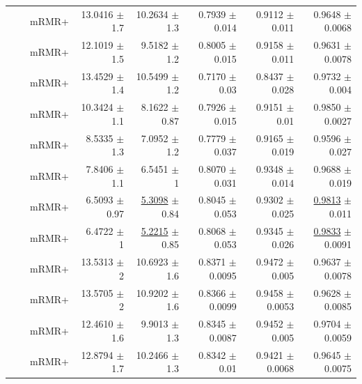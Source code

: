 \begin{longtable}{llp{}rrrrr}
 &  & mRMR+ & 13.0416 {\scriptsize $\pm$ 1.7} & 10.2634 {\scriptsize $\pm$ 1.3} & 0.7939 {\scriptsize $\pm$ 0.014} & 0.9112 {\scriptsize $\pm$ 0.011} & 0.9648 {\scriptsize $\pm$ 0.0068} \\
 &  & mRMR+ & 12.1019 {\scriptsize $\pm$ 1.5} & 9.5182 {\scriptsize $\pm$ 1.2} & 0.8005 {\scriptsize $\pm$ 0.015} & 0.9158 {\scriptsize $\pm$ 0.011} & 0.9631 {\scriptsize $\pm$ 0.0078} \\
 &  & mRMR+ & 13.4529 {\scriptsize $\pm$ 1.4} & 10.5499 {\scriptsize $\pm$ 1.2} & 0.7170 {\scriptsize $\pm$ 0.03} & 0.8437 {\scriptsize $\pm$ 0.028} & 0.9732 {\scriptsize $\pm$ 0.004} \\
 &  & mRMR+ & 10.3424 {\scriptsize $\pm$ 1.1} & 8.1622 {\scriptsize $\pm$ 0.87} & 0.7926 {\scriptsize $\pm$ 0.015} & 0.9151 {\scriptsize $\pm$ 0.01} & 0.9850 {\scriptsize $\pm$ 0.0027} \\
 &  & mRMR+ & 8.5335 {\scriptsize $\pm$ 1.3} & 7.0952 {\scriptsize $\pm$ 1.2} & 0.7779 {\scriptsize $\pm$ 0.037} & 0.9165 {\scriptsize $\pm$ 0.019} & 0.9596 {\scriptsize $\pm$ 0.027} \\
 &  & mRMR+ & 7.8406 {\scriptsize $\pm$ 1.1} & 6.5451 {\scriptsize $\pm$ 1} & 0.8070 {\scriptsize $\pm$ 0.031} & 0.9348 {\scriptsize $\pm$ 0.014} & 0.9688 {\scriptsize $\pm$ 0.019} \\
 &  & mRMR+ & 6.5093 {\scriptsize $\pm$ 0.97} & \underline{5.3098} {\scriptsize $\pm$ 0.84} & 0.8045 {\scriptsize $\pm$ 0.053} & 0.9302 {\scriptsize $\pm$ 0.025} & \underline{0.9813} {\scriptsize $\pm$ 0.011} \\
 &  & mRMR+ & 6.4722 {\scriptsize $\pm$ 1} & \underline{5.2215} {\scriptsize $\pm$ 0.85} & 0.8068 {\scriptsize $\pm$ 0.053} & 0.9345 {\scriptsize $\pm$ 0.026} & \underline{0.9833} {\scriptsize $\pm$ 0.0091} \\
 &  & mRMR+ & 13.5313 {\scriptsize $\pm$ 2} & 10.6923 {\scriptsize $\pm$ 1.6} & 0.8371 {\scriptsize $\pm$ 0.0095} & 0.9472 {\scriptsize $\pm$ 0.005} & 0.9637 {\scriptsize $\pm$ 0.0078} \\
 &  & mRMR+ & 13.5705 {\scriptsize $\pm$ 2} & 10.9202 {\scriptsize $\pm$ 1.6} & 0.8366 {\scriptsize $\pm$ 0.0099} & 0.9458 {\scriptsize $\pm$ 0.0053} & 0.9628 {\scriptsize $\pm$ 0.0085} \\
 &  & mRMR+ & 12.4610 {\scriptsize $\pm$ 1.6} & 9.9013 {\scriptsize $\pm$ 1.3} & 0.8345 {\scriptsize $\pm$ 0.0087} & 0.9452 {\scriptsize $\pm$ 0.005} & 0.9704 {\scriptsize $\pm$ 0.0059} \\
 &  & mRMR+ & 12.8794 {\scriptsize $\pm$ 1.7} & 10.2466 {\scriptsize $\pm$ 1.3} & 0.8342 {\scriptsize $\pm$ 0.01} & 0.9421 {\scriptsize $\pm$ 0.0068} & 0.9645 {\scriptsize $\pm$ 0.0075} \\

\end{longtable}
